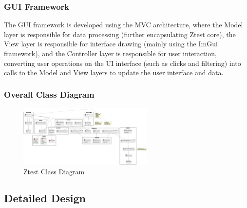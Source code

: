 \documentclass{article}
\begin{document}
\subsubsection{GUI Framework}
The GUI framework is developed using the MVC architecture, where the Model layer is responsible for data processing (further encapsulating Ztest core), the View layer is responsible for interface drawing (mainly using the ImGui framework), and the Controller layer is responsible for user interaction, converting user operations on the UI interface (such as clicks and filtering) into calls to the Model and View layers to update the user interface and data.
\subsubsection{Overall Class Diagram}
\begin{figure}[H]
    \centering
    \includegraphics[angle=270,width=0.6\textwidth]{img/class.png} %
    \caption{Ztest Class Diagram}
    \label{fig:ztest class }
\end{figure}
\subsection{Detailed Design}
\end{document}
